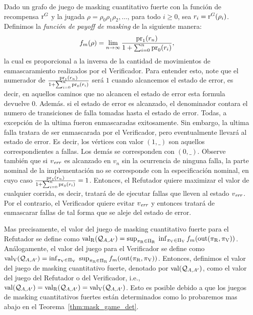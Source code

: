Dado un grafo de juego de masking cuantitativo fuerte con la función de recompensa $\operatorname{r}^G$ y la jugada 
$\rho = \rho_0 \rho_1 \rho_2, \ldots$, para todo $i \geq 0$, sea 
$r_i = \operatorname{r}^G(\rho_i)$.
Definimos la \emph{función de payoff de masking} de la siguiente manera: 
\[%
\FMask(\rho) = \lim_{n \rightarrow \infty}  \frac{\pr{1}{r_n}}{1+ \sum^{n}_{i=0} \pr{0}{r_i}},
\]
la cual es proporcional a la inversa de la cantidad de movimientos de enmascaramiento realizados por el Verificador. Para entender esto, note que el numerador de $\frac{\operatorname{pr}_{1}(r_n)}{1+ \sum^{n}_{i=0} \operatorname{pr}_{0}(r_i)}$ será $1$
cuando alcancemos el estado de error, es decir, en aquellos caminos que no alcancen el estado de error esta formula devuelve $0$. Además. si el estado de error es alcanzado,  el denominador contara el numero de transiciones de falla tomadas hasta el estado de error. Todas, a excepción de la ultima fueron enmascaradas exitosamente. Sin embargo, la ultima falla tratara de ser enmascarada por el Verificador, pero eventualmente llevará al estado de error.
Es decir, los vértices con valor $(1,\_)$ son aquellos correspondientes a fallas. Los demás se corresponden con $(0,\_)$.
Observe también que si $v_{\mathit{err}}$ es alcanzado en $v_n$ sin la ocurrencia de ninguna falla, la parte nominal de la implementación no se corresponde con la especificación nominal, en cuyo caso $\frac{\operatorname{pr}_{1}(r_n)}{1+ \sum^{n}_{i=0} \operatorname{pr}_{0}(r_i)}=1$.
Entonces, 
el Refutador quiere maximizar el valor de cualquier corrida, es decir, tratará de de ejecutar fallas que lleven al estado $v_{\mathit{err}}$. 
Por el contrario, el Verificador quiere evitar $v_{\mathit{err}}$ y entonces tratará de enmascarar fallas de tal forma que se aleje del estado de error. 

Mas precisamente, el valor del juego de masking cuantitativo fuerte para el Refutador se define como $\operatorname{val}_{\mathrm{R}}(\mathcal{Q}_{A, A'}) = \sup_{\pi_{\mathrm{R}} \in \Pi_{\mathrm{R}}} \; \inf_{\pi_{\mathrm{V}} \in \Pi_{\mathrm{V}}} f_{m}(\operatorname{out}(\pi_{\mathrm{R}}, \pi_{\mathrm{V}}))$. Análogamente, el valor del juego para el Verificador se define como $\operatorname{val}_{\mathrm{V}}(\mathcal{Q}_{A, A'}) = \inf_{\pi_{\mathrm{V}} \in \Pi_{\mathrm{V}}} \; \sup_{\pi_{\mathrm{R}} \in \Pi_{\mathrm{R}}} f_{m}(\operatorname{out}(\pi_{\mathrm{R}}, 
\pi_{\mathrm{V}}))$. Entonces, definimos el valor del juego de masking cuantitativo fuerte, denotado por $\operatorname{val}(\mathcal{Q}_{A, A'})$, como el valor del juego del Refutador o del Verificador, i.e., $\operatorname{val}(\mathcal{Q}_{A, A'}) = \operatorname{val}_{\mathrm{R}}(\mathcal{Q}_{A, A'}) = \operatorname{val}_{\mathrm{V}}(\mathcal{Q}_{A, A'})$. Esto es posible debido a que los juegos de masking cuantitativos fuertes están determinados como lo probaremos mas abajo en el Teorema~\ref{thm:mask_game_det}. \\


